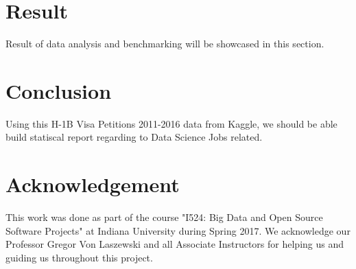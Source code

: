 \documentclass[9pt,twocolumn,twoside]{../../styles/osajnl}
\begin{document}
\section{Result}
Result of data analysis and benchmarking will be showcased in this section. 

\section{Conclusion}

Using this H-1B Visa Petitions 2011-2016 data from Kaggle,  we should be able build statiscal report regarding to Data Science Jobs related. 

\section{Acknowledgement}

This work was done as part of the course "I524: Big Data and Open Source Software Projects" at Indiana University during Spring 2017. We acknowledge our Professor Gregor Von Laszewski and all Associate Instructors for helping us and guiding us throughout this project.




\end{document}
